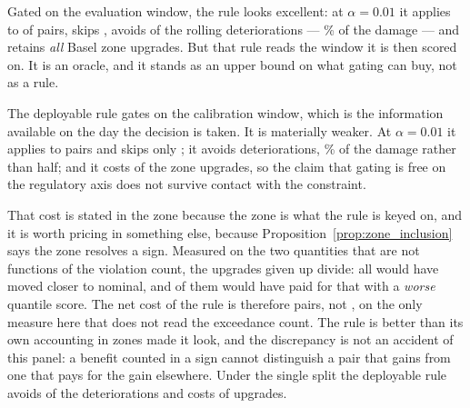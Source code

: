 \documentclass[preprint,11pt,authoryear]{elsarticle}
\newcommand{\1}{\boldsymbol{1}}
\begin{document}
Gated on the evaluation window, the rule looks excellent: at $\alpha = 0.01$ it
applies to \nGateRollOracleApplied{} of \nSeqPairs{} pairs, skips
\nGateRollOracleSkipped, avoids \nGateRollOracleAvoided{} of the
\nDegradedRoll{} rolling deteriorations --- \nGateRollOracleAvoidedPct\% of the
damage --- and retains \emph{all} \nGateRollOracleUpgrades{} Basel zone
upgrades. But that rule reads the window it is then scored on. It is an oracle,
and it stands as an upper bound on what gating can buy, not as a rule.

The deployable rule gates on the calibration window, which is the information
available on the day the decision is taken. It is materially weaker. At
$\alpha = 0.01$ it applies to \nGateRollApplied{} pairs and skips only
\nGateRollSkipped; it avoids \nGateRollAvoided{} deteriorations,
\nGateRollAvoidedPct\% of the damage rather than half; and it costs
\nGateRollUpgradesLost{} of the \nGateRollUpgrades{} zone upgrades, so the claim
that gating is free on the regulatory axis does not survive contact with the
constraint.

That cost is stated in the zone because the zone is what the rule is keyed on,
and it is worth pricing in something else, because Proposition~\ref{prop:zone_inclusion}
says the zone resolves a sign. Measured on the two quantities that are not
functions of the violation count, the \nGateRollUpgradesLost{} upgrades given up
divide: all \nGateRollUpgradesLost{} would have moved closer to nominal, and
\nGateRollUpgradesLostWorse{} of them would have paid for that with a
\emph{worse} quantile score. The net cost of the rule is therefore
\nGateRollUpgradesLostNet{} pairs, not \nGateRollUpgradesLost, on the only
measure here that does not read the exceedance count. The rule is better than
its own accounting in zones made it look, and the discrepancy is not an
accident of this panel: a benefit counted in a sign cannot distinguish a pair
that gains from one that pays for the gain elsewhere. Under the single split the deployable rule avoids
\nGateStaticAvoided{} of the \nDegradedStatic{} deteriorations and costs
\nGateStaticUpgradesLost{} of \nGateStaticUpgrades{} upgrades.
\end{document}
